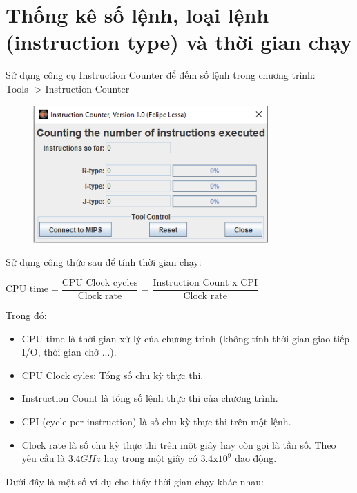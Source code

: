 \documentclass[a4paper]{article}
\begin{document}
\section{Thống kê số lệnh, loại lệnh (instruction type) và thời gian chạy}
Sử dụng công cụ Instruction Counter để đếm số lệnh trong chương trình: \\
Tools -> Instruction Counter
\begin{center}
	\begin{figure}[h!]
		\begin{center}
			\includegraphics[width=9cm]{Images/1.png}
		\end{center}
	\end{figure}
\end{center}
Sử dụng công thức sau để tính thời gian chạy:
\begin{center}
	$\text{CPU time} = \dfrac{\text{CPU Clock cycles}}{\text{Clock rate}}$ = $\dfrac{\text{Instruction Count x CPI}}{\text{Clock rate}}$
\end{center}
Trong đó:
\begin{itemize}
	\item CPU time là thời gian xử lý của chương trình (không tính thời gian giao tiếp I/O, thời gian chờ ...).
	\item CPU Clock cyles: Tổng số chu kỳ thực thi.
	\item Instruction Count là tổng số lệnh thực thi của chương trình.
	\item CPI (cycle per instruction) là số chu kỳ thực thi trên một lệnh.
	\item Clock rate là số chu kỳ thực thi trên một giây hay còn gọi là tần số. Theo yêu cầu là $3.4GHz$ hay trong một giây có $3.4\text{x}10^9$ dao động.
\end{itemize}
Dưới đây là một số ví dụ cho thấy thời gian chạy khác nhau:
\end{document}
